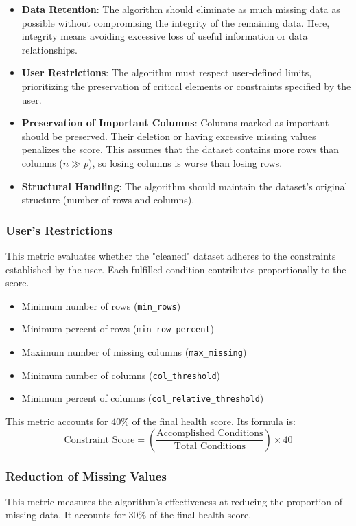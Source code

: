 \documentclass[a4paper,12pt]{article}
\begin{document}
\begin{itemize}
    \item \textbf{Data Retention}: The algorithm should eliminate as much missing data as possible without compromising the integrity of the remaining data. Here, integrity means avoiding excessive loss of useful information or data relationships.
    \item \textbf{User Restrictions}: The algorithm must respect user-defined limits, prioritizing the preservation of critical elements or constraints specified by the user.
    \item \textbf{Preservation of Important Columns}: Columns marked as important should be preserved. Their deletion or having excessive missing values penalizes the score. This assumes that the dataset contains more rows than columns (\(n \gg p\)), so losing columns is worse than losing rows.
    \item \textbf{Structural Handling}: The algorithm should maintain the dataset's original structure (number of rows and columns).
\end{itemize}

\subsubsection{User's Restrictions}
This metric evaluates whether the "cleaned" dataset adheres to the constraints established by the user. Each fulfilled condition contributes proportionally to the score.

\begin{itemize}
    \item Minimum number of rows (\texttt{min\_rows})
    \item Minimum percent of rows (\texttt{min\_row\_percent})
    \item Maximum number of missing columns (\texttt{max\_missing})
    \item Minimum number of columns (\texttt{col\_threshold})
    \item Minimum percent of columns (\texttt{col\_relative\_threshold})
\end{itemize}

This metric accounts for 40\% of the final health score. Its formula is:
\[
\text{Constraint\_Score} = \left( \frac{\text{Accomplished Conditions}}{\text{Total Conditions}} \right) \times 40
\]

\subsubsection{Reduction of Missing Values}
This metric measures the algorithm's effectiveness at reducing the proportion of missing data. It accounts for 30\% of the final health score.
\end{document}
